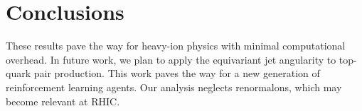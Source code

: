 \section{Conclusions}\label{sec:conclusions}

These results pave the way for heavy-ion physics with minimal
computational overhead. In future work, we plan to apply the equivariant
jet angularity to top-quark pair production. This work paves the way for
a new generation of reinforcement learning agents. Our analysis neglects
renormalons, which may become relevant at RHIC.

